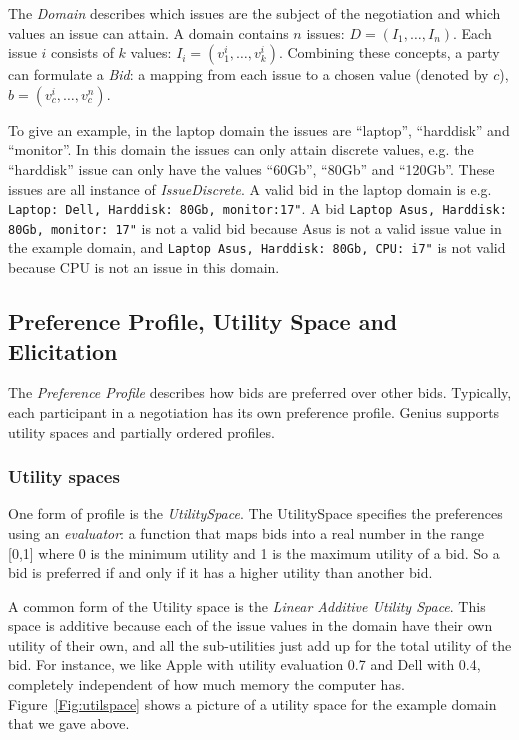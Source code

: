 \documentclass[]{llncs}
\newcommand\Genius{{\sc Genius}}
\begin{document}
The \textit{Domain} describes which issues are the subject of the negotiation and which values an issue can attain. A domain contains $n$ issues: $D=(I_1,\ldots,I_n)$. Each issue $i$ consists of $k$ values: $I_i=(v^i_1,\ldots,v^i_k)$.  Combining these concepts, a party can formulate a \textit{Bid}: a mapping from each issue to a chosen value (denoted by $c$), $b=(v^i_{c},\ldots,v^n_{c})$. 

To give an example, in the laptop domain the issues are ``laptop'', ``harddisk'' and ``monitor''. In this domain the issues can only attain discrete values, e.g. the ``harddisk'' issue can only have the values ``60Gb'', ``80Gb'' and ``120Gb''. These issues are all instance of \textit{IssueDiscrete}. A valid bid in the laptop domain is e.g. \verb|Laptop: Dell, Harddisk: 80Gb, monitor:17"|. A bid \verb|Laptop Asus, Harddisk: 80Gb, monitor: 17"| is not a valid bid because Asus is not a valid issue value in the example domain, and \verb|Laptop Asus, Harddisk: 80Gb, CPU: i7"|  is not valid because CPU is not an issue in this domain. 

\subsection{Preference Profile, Utility Space and Elicitation}
The \textit{Preference Profile} describes how bids are preferred over other bids. Typically, each participant in a negotiation has its own preference profile. {\Genius} supports utility spaces and partially ordered profiles.

\subsubsection{Utility spaces}
One form of profile is the \textit{UtilitySpace}. The UtilitySpace specifies the preferences using an \textit{evaluator}: a function that maps bids into a real number in the range [0,1] where 0 is the minimum utility and 1 is the maximum utility of a bid. So a bid is preferred if and only if it has a higher utility than another bid.

A common form of the Utility space is the \textit{Linear Additive Utility Space}. This space is additive because each of the issue values in the domain have their own utility of their own, and all the sub-utilities just add up for the total utility of the bid. For instance, we like Apple with utility evaluation 0.7 and Dell with 0.4, completely independent of how much memory the computer has. Figure~\ref{Fig:utilspace} shows a picture of a utility space for the example domain that we gave above.
\end{document}
